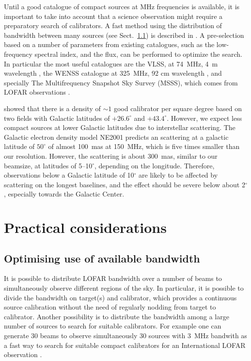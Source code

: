 \documentclass[graybox]{svmult}
\begin{document}
Until a good catalogue of compact sources at MHz frequencies is available, it
is important to take into account that a science observation might require a
preparatory search of calibrators. A fast method using the distribution of
bandwidth between many sources (see Sect.~\ref{sec:bandwidth}) is described in
\cite{moldon15}. A pre-selection based on a number of parameters from existing
catalogues, such as the low-frequency spectral index, and the flux, can be
performed to optimize the search. In particular the most useful catalogues are
the VLSS, at 74~MHz, 4~m wavelength \citep{lane12a}, the WENSS catalogue at
325~MHz, 92 cm wavelength \citep{rengelink97}, and specially The Multifrequency
Snapshot Sky Survey (MSSS), which comes from LOFAR observations
\citep{heald14}. 

\cite{moldon15} showed that there is a density of $\sim1$ good calibrator per
square degree based on two fields with Galactic latitudes of $+26.6^{\circ}$
and $+43.4^{\circ} $. However, we expect less compact sources at lower Galactic
latitudes due to interstellar scattering. The Galactic electron density model
NE2001 \citep{cordes02} predicts an scattering at a galactic latitude of
$50^{\circ}$ of almost 100~mas at 150~MHz, which is five times smaller than our
resolution. However, the scattering is about 300~mas, similar to our beamsize,
at latitudes of 5--10$^{\circ}$, depending on the longitude. Therefore,
observations below a Galactic latitude of 10$^{\circ}$ are likely to be
affected by scattering on the longest baselines, and the effect should be
severe below about 2$^{\circ}$, especially towards the Galactic Center. 


\section{Practical considerations}
\label{sec:practical}


\subsection{Optimising use of available bandwidth}\label{sec:bandwidth}
It is possible to distribute LOFAR bandwidth over a number of beams to
simultaneously observe different regions of the sky. In particular, it is
possible to divide the bandwidth on target(s) and calibrator, which provides a
continuous source calibration without the need of regularly nodding from target
to calibrator. Another possibility is to distribute the bandwidth among a large
number of sources to search for suitable calibrators. For example one can
generate 30 beams to observe simultaneously 30 sources with 3~MHz bandwith as a
fast way to search for suitable compact calibrators for an
International LOFAR observation \citep[see i.e.][]{moldon15}. 
\end{document}
